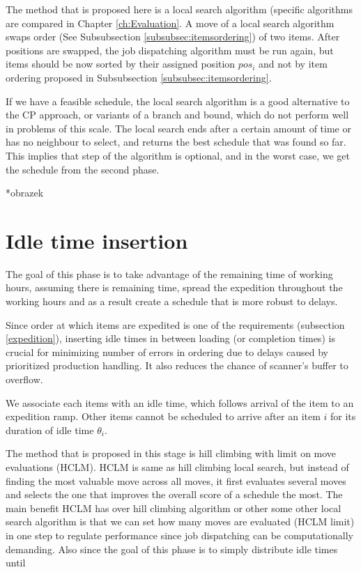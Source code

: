 \documentclass{ctuthesis}
\begin{document}
The method that is proposed here is a local search algorithm (specific algorithms are compared in Chapter \ref{ch:Evaluation}. A move of a local search algorithm swaps order (See Subsubsection \ref{subsubsec:itemsordering}) of two items. After positions are swapped, the job dispatching algorithm must be run again, but items should be now sorted by their assigned position $pos_i$ and not by item ordering proposed in Subsubsection \ref{subsubsec:itemsordering}.

If we have a feasible schedule, the local search algorithm is a good alternative to the CP approach, or variants of a branch and bound, which do not perform well in problems of this scale. The local search ends after a certain amount of time or has no neighbour to select, and returns the best schedule that was found so far. This implies that step of the algorithm is optional, and in the worst case, we get the schedule from the second phase.

*obrazek

\section{Idle time insertion}

The goal of this phase is to take advantage of the remaining time of working hours, assuming there is remaining time, spread the expedition throughout the working hours and as a result create a schedule that is more robust to delays. 

Since order at which items are expedited is one of the requirements (subsection \ref{expedition}), inserting idle times in between loading (or completion times) is crucial for minimizing number of errors in ordering due to delays caused by prioritized production handling. It also reduces the chance of scanner's buffer to overflow.


We associate each items with an idle time, which follows arrival of the item to an expedition ramp. Other items cannot be scheduled to arrive after an item $i$ for its duration of idle time $\theta_i$.

The method that is proposed in this stage is hill climbing with limit on move evaluations (HCLM). HCLM is same as hill climbing local search, but instead of finding the most valuable move across all moves, it first evaluates several moves and selects the one that improves the overall score of a schedule the most. The main benefit HCLM has over hill climbing algorithm or other some other local search algorithm is that we can set how many moves are evaluated (HCLM limit) in one step to regulate performance since job dispatching can be computationally demanding. Also since the goal of this phase is to simply distribute idle times until 
\end{document}
